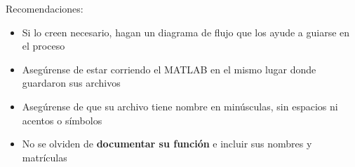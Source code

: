 \documentclass[]{book}
\theoremstyle{definition}
\begin{document}
\pagebreak

{\Large Recomendaciones:}
\begin{itemize}
    \item Si lo creen necesario, hagan un diagrama de flujo que los ayude a guiarse en el proceso
    \item Asegúrense de estar corriendo el MATLAB en el mismo lugar donde guardaron sus archivos
    \item Asegúrense de que su archivo tiene nombre en minúsculas, sin espacios ni acentos o símbolos
    \item No se olviden de \textbf{documentar su función} e incluir sus nombres y matrículas
\end{itemize}
\end{document}
